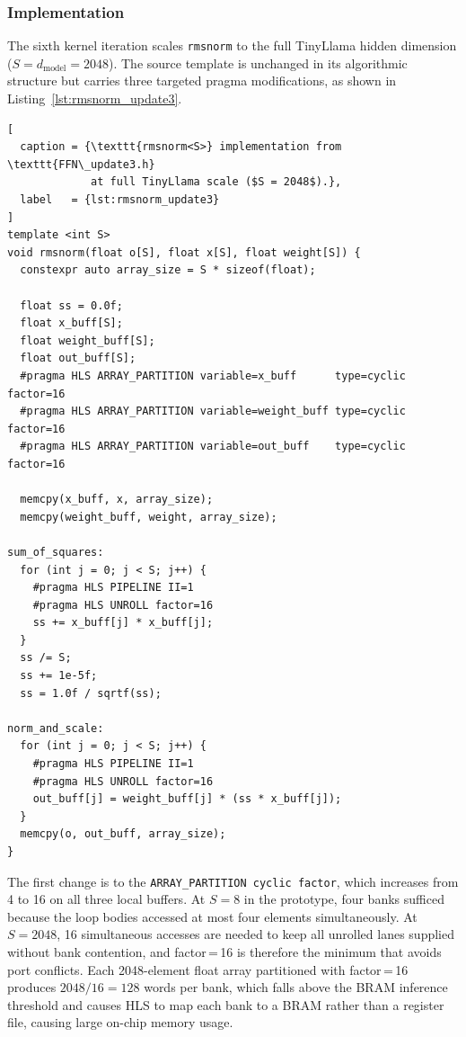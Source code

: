 \subsubsection{Implementation}
\label{subsubsec:rmsnorm_update3_impl}

The sixth kernel iteration scales \texttt{rmsnorm} to the full TinyLlama
hidden dimension ($S = d_{\text{model}} = 2048$). The source template is
unchanged in its algorithmic structure but carries three targeted pragma
modifications, as shown in Listing~\ref{lst:rmsnorm_update3}.

\begin{lstlisting}[
  caption = {\texttt{rmsnorm<S>} implementation from \texttt{FFN\_update3.h}
             at full TinyLlama scale ($S = 2048$).},
  label   = {lst:rmsnorm_update3}
]
template <int S>
void rmsnorm(float o[S], float x[S], float weight[S]) {
  constexpr auto array_size = S * sizeof(float);

  float ss = 0.0f;
  float x_buff[S];
  float weight_buff[S];
  float out_buff[S];
  #pragma HLS ARRAY_PARTITION variable=x_buff      type=cyclic factor=16
  #pragma HLS ARRAY_PARTITION variable=weight_buff type=cyclic factor=16
  #pragma HLS ARRAY_PARTITION variable=out_buff    type=cyclic factor=16

  memcpy(x_buff, x, array_size);
  memcpy(weight_buff, weight, array_size);

sum_of_squares:
  for (int j = 0; j < S; j++) {
    #pragma HLS PIPELINE II=1
    #pragma HLS UNROLL factor=16
    ss += x_buff[j] * x_buff[j];
  }
  ss /= S;
  ss += 1e-5f;
  ss = 1.0f / sqrtf(ss);

norm_and_scale:
  for (int j = 0; j < S; j++) {
    #pragma HLS PIPELINE II=1
    #pragma HLS UNROLL factor=16
    out_buff[j] = weight_buff[j] * (ss * x_buff[j]);
  }
  memcpy(o, out_buff, array_size);
}
\end{lstlisting}

The first change is to the \texttt{ARRAY\_PARTITION cyclic factor}, which
increases from 4 to 16 on all three local buffers. At $S = 8$ in the
prototype, four banks sufficed because the loop bodies accessed at most
four elements simultaneously. At $S = 2048$, 16 simultaneous accesses are
needed to keep all unrolled lanes supplied without bank contention,
and factor\,=\,16 is therefore the minimum that avoids port conflicts. Each
2048-element float array partitioned with factor\,=\,16 produces
$2048 / 16 = 128$ words per bank, which falls above the BRAM inference
threshold and causes HLS to map each bank to a BRAM rather than a register
file, causing large on-chip memory usage.

